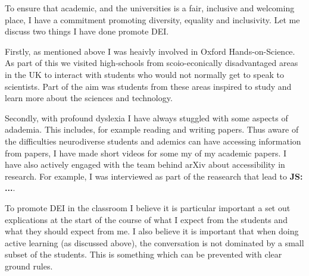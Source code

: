 \documentclass[12pt,letter]{article}
\newcommand{\js}[1]{{\leavevmode\color{magenta}\bf  JS: #1}}
\newcounter{customtitle}
\begin{document}
 
To ensure that academic, and the universities is a fair, inclusive and welcoming place, I have a commitment promoting diversity, equality and inclusivity. Let me discuss two things I have done promote DEI. 

Firstly, as mentioned above I was heaivly involved in Oxford Hands-on-Science. As part of this we visited high-schools from scoio-econically disadvantaged areas in the UK to interact with students who would not normally get to speak to scientists. Part of the aim was students from these areas inspired to study and learn more about the sciences and technology. 

Secondly, with profound dyslexia I have always stuggled with some aspects of adademia. This includes, for example reading and writing papers. Thus aware of the difficulties neurodiverse students and ademics can have accessing information from papers, I have made short videos for some my of my academic papers. I have also actively engaged with the team behind arXiv about accessibility in research. For example, I was interviewed  as part of the reasearch that lead to \js{...}. 

To promote DEI in the classroom I believe it is particular important a set out explications at the start of the course of what I expect from the students and what they should expect from me. I also believe it is important that when doing active learning (as discussed above), the conversation is not dominated by a small subset of the students. This is something which can be prevented with clear ground rules.  




\end{document}
